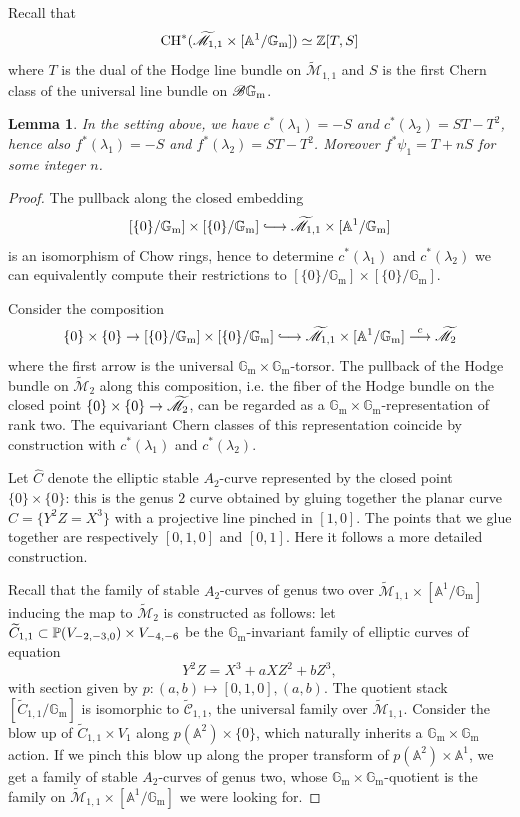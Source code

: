 \documentclass[a4paper, 10pt]{amsart}
\numberwithin{equation}{section}
\numberwithin{subsection}{section}
\newtheorem{lemma}[theorem]{Lemma}
\theoremstyle{definition}
\theoremstyle{remark}
\renewcommand{\mathcal}{\mathscr}
\renewcommand\AA{\mathbb{A}} \newcommand\BB{\mathbb{B}}
\newcommand\GG{\mathbb{G}} \newcommand\HH{\mathbb{H}}
\newcommand\rmm{\mathrm{m}} \newcommand\rmn{\mathrm{n}}
\newcommand\arr{\ifinner\to\else\longrightarrow\fi}
\newcommand\larr{\longrightarrow}
\newcommand{\hooklongrightarrow}{\lhook\joinrel\longrightarrow}
\newcommand{\gm}{\GG_{\rmm}}
\newcommand{\Mtilde}{\widetilde{\mathcal M}}
\newcommand{\Ctilde}{\widetilde{\mathcal C}}
\newcommand{\ch}[1][*]{\operatorname{CH}^{#1}}
\begin{document}
	Recall that
	\[ \ch(\Mtilde_{1,1}\times[\AA^1/\gm]) \simeq \ZZ[T,S] \]
	where $T$ is the dual of the Hodge line bundle on $\Mtilde_{1,1}$ and $S$ is the first Chern class of the universal line bundle on $\cB\gm$.
	\begin{lemma}\label{prop:cusp rel M2tilde}
		In the setting above, we have $c^*(\lambda_1)= -S$ and $c^*(\lambda_2)=ST-T^2$, hence also $f^*(\lambda_1)= -S$ and $f^*(\lambda_2)=ST-T^2$. Moreover $f^*\psi_1=T+nS$ for some integer $n$.
	\end{lemma}
	\begin{proof}
		The pullback along the closed embedding
		\[ [\{0\}/\gm]\times [\{0\}/\gm] \hooklongrightarrow \Mtilde_{1,1}\times [\AA^1/\gm]\]
		is an isomorphism of Chow rings, hence to determine $c^*(\lambda_1)$ and $c^*(\lambda_2)$ we can equivalently compute their restrictions to $[\{0\}/\gm]\times [\{0\}/\gm]$.
		
		Consider the composition
		\[ \{0\}\times\{0\} \arr[\{0\}/\gm]\times [\{0\}/\gm] \hooklongrightarrow \Mtilde_{1,1}\times [\AA^1/\gm] \overset{c}{\larr} \Mtilde_2  \]
		where the first arrow is the universal $\gm\times\gm$-torsor. The pullback of the Hodge bundle on $\Mtilde_2$ along this composition, i.e. the fiber of the Hodge bundle on the closed point $\{0\}\times\{0\}\arr\Mtilde_2$, can be regarded as a $\gm\times\gm$-representation of rank two. The equivariant Chern classes of this representation coincide by construction with $c^*(\lambda_1)$ and $c^*(\lambda_2)$.
		
		Let $\widehat{C}$ denote the elliptic stable $A_2$-curve represented by the closed point $\{0\}\times\{0\}$: this is the genus $2$ curve obtained by gluing together the planar curve $C=\{Y^2Z=X^3\}$ with a projective line pinched in $[1,0]$. The points that we glue together are respectively $[0,1,0]$ and $[0,1]$. Here it follows a more detailed construction.
		
		Recall that the family of stable $A_2$-curves of genus two over $\Mtilde_{1,1}\times[\AA^1/\gm]$ inducing the map to $\Mtilde_2$ is constructed as follows: let $\widetilde{C}_{1,1}\subset\mathbb{P}(V_{-2,-3,0})\times V_{-4,-6}$ be the $\gm$-invariant family of elliptic curves of equation
		\[ Y^2Z=X^3+aXZ^2+bZ^3, \]
		with section given by $p:(a,b)\mapsto [0,1,0],(a,b)$. The quotient stack $[\widetilde{C}_{1,1}/\gm]$ is isomorphic to $\Ctilde_{1,1}$, the universal family over $\Mtilde_{1,1}$.
		Consider the blow up of $\widetilde{C}_{1,1}\times V_1$ along $p(\AA^2)\times \{0\}$, which naturally inherits a $\gm\times\gm$ action. If we pinch this blow up along the proper transform of $p(\AA^2)\times \AA^1$, we get a family of stable $A_2$-curves of genus two, whose $\gm\times\gm$-quotient is the family on $\Mtilde_{1,1}\times[\AA^1/\gm]$ we were looking for.
		

\end{proof}
\end{document}
